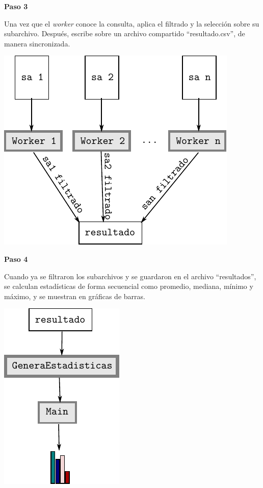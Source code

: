 \documentclass{beamer}
\begin{document}
\begin{frame}

\textbf{Paso 3}

Una vez que el \textit{worker} conoce la consulta, aplica el filtrado y la selección sobre su subarchivo. Después, escribe sobre un archivo compartido ``resultado.csv'', de manera sincronizada.

\begin{center}
\includegraphics[scale=0.6]{filtrado}
\end{center}

\end{frame}

\begin{frame}

\textbf{Paso 4}

Cuando ya se filtraron los subarchivos y se guardaron en el archivo ``resultados'', se calculan estadísticas de forma secuencial como promedio, mediana, mínimo y máximo, y se muestran en gráficas de barras.

\begin{center}
\includegraphics[scale=0.6]{estadisticas}
\end{center}

\end{frame}
\end{document}
